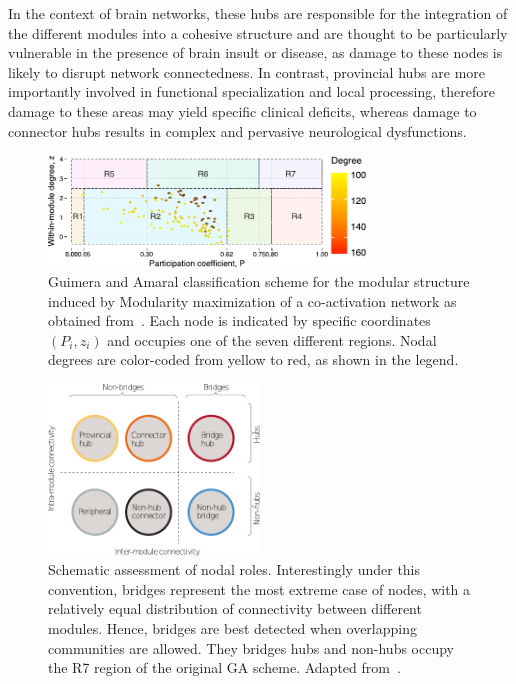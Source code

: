 In the context of brain networks, these hubs are responsible for the integration of the different modules into a cohesive structure and are thought to be particularly vulnerable in the presence of brain insult or disease, as damage to these nodes is likely to disrupt network connectedness.
In contrast, provincial hubs are more importantly involved in functional specialization and local processing, therefore damage to these areas may yield specific clinical deficits, whereas damage to connector hubs results in complex and pervasive neurological dysfunctions.

\begin{figure}[htb!]
\centering
\includegraphics[width=0.75\textwidth]{images/guimera_amaral_coact_q.pdf}
\caption{Guimera and Amaral classification scheme for the modular structure induced by Modularity maximization of a co-activation network as obtained from~\cite{crossley2013a}.
Each node is indicated by specific coordinates $(P_i,z_i)$ and occupies one of the seven different regions. Nodal degrees are color-coded from yellow to red, as shown in the legend.}
\label{fig:gagraph}
\end{figure}

\begin{figure}[htb!]
\centering
\includegraphics[width=0.5\textwidth]{images/hubs_nonhubs.pdf}
\caption{Schematic assessment of nodal roles.
Interestingly under this convention, bridges represent the most extreme case of nodes, with a relatively equal distribution of connectivity between different modules.
Hence, bridges are best detected when overlapping communities are allowed.
They bridges hubs and non-hubs occupy the R7 region of the original GA scheme.
Adapted from~\cite{fornito2015}.}
\label{fig:hubs_bridges}
\end{figure}

